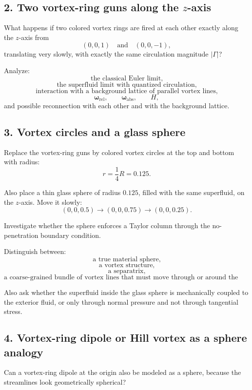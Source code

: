\documentclass[11pt,a4paper]{article}
\begin{document}
\subsection{2. Two vortex-ring guns along the \(z\)-axis}

What happens if two colored vortex rings are fired at each other exactly along the \(z\)-axis from
\[
(0,0,1)
\quad\text{and}\quad
(0,0,-1),
\]
translating very slowly, with exactly the same circulation magnitude \(|\Gamma|\)?

Analyze:
\[
\text{the classical Euler limit,}
\]
\[
\text{the superfluid limit with quantized circulation,}
\]
\[
\text{interaction with a background lattice of parallel vortex lines,}
\]
\[
\boldsymbol{\omega}_{\mathrm{rel}},
\qquad
\boldsymbol{\omega}_{\mathrm{abs}},
\qquad
H,
\]
and possible reconnection with each other and with the background lattice.

\subsection{3. Vortex circles and a glass sphere}

Replace the vortex-ring guns by colored vortex circles at the top and bottom with radius:
\[
r=\frac{1}{4}R=0.125.
\]

Also place a thin glass sphere of radius \(0.125\), filled with the same superfluid, on the \(z\)-axis. Move it slowly:
\[
(0,0,0.5)
\rightarrow
(0,0,0.75)
\rightarrow
(0,0,0.25).
\]

Investigate whether the sphere enforces a Taylor column through the no-penetration boundary condition.

Distinguish between:
\[
\text{a true material sphere,}
\]
\[
\text{a vortex structure,}
\]
\[
\text{a separatrix,}
\]
\[
\text{a coarse-grained bundle of vortex lines that must move through or around the sphere.}
\]

Also ask whether the superfluid inside the glass sphere is mechanically coupled to the exterior fluid, or only through normal pressure and not through tangential stress.

\subsection{4. Vortex-ring dipole or Hill vortex as a sphere analogy}

Can a vortex-ring dipole at the origin also be modeled as a sphere, because the streamlines look geometrically spherical?
\end{document}
